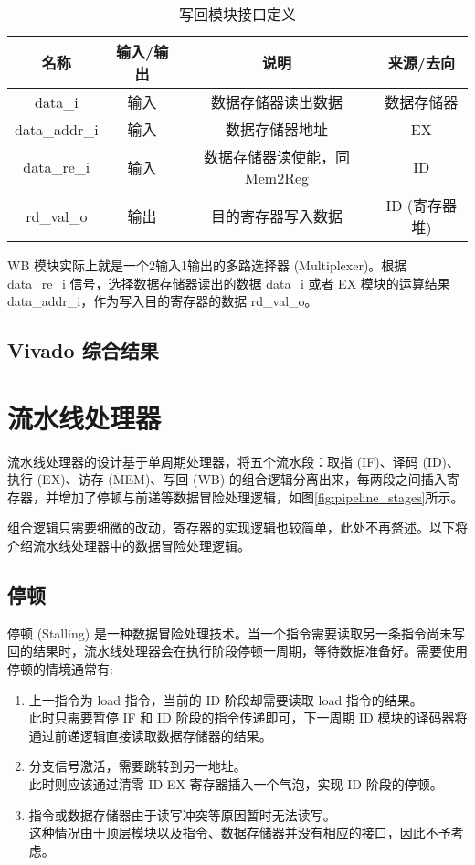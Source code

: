 \documentclass[lang=zh]{sjtureport}
\begin{document}
\begin{table}[!htp]
	\centering
	\caption{写回模块接口定义}
	\label{tab:single_wb_io}
	\begin{tabular}{|c|c|c|c|}
		\hline
		名称 & 输入/输出 & 说明 & 来源/去向 \\
		\hline
		data\_i & 输入 & 数据存储器读出数据 & 数据存储器 \\
		\hline
		data\_addr\_i & 输入 & 数据存储器地址 & EX \\
		\hline
		data\_re\_i & 输入 & 数据存储器读使能，同Mem2Reg\cite{COD} & ID \\
		\hline
		rd\_val\_o & 输出 & 目的寄存器写入数据 & ID (寄存器堆) \\
		\hline
	\end{tabular}
\end{table}

WB 模块实际上就是一个2输入1输出的多路选择器 (Multiplexer)。根据 data\_re\_i 信号，选择数据存储器读出的数据 data\_i 或者 EX 模块的运算结果 data\_addr\_i，作为写入目的寄存器的数据 rd\_val\_o。

\subsection{Vivado 综合结果}

\section{流水线处理器}

流水线处理器的设计基于单周期处理器，将五个流水段：取指 (IF)、译码 (ID)、执行 (EX)、访存 (MEM)、写回 (WB) 的组合逻辑分离出来，每两段之间插入寄存器，并增加了停顿与前递等数据冒险处理逻辑，如图\ref{fig:pipeline_stages}所示。

组合逻辑只需要细微的改动，寄存器的实现逻辑也较简单，此处不再赘述。以下将介绍流水线处理器中的数据冒险处理逻辑。

\subsection{停顿}

停顿 (Stalling) 是一种数据冒险处理技术。当一个指令需要读取另一条指令尚未写回的结果时，流水线处理器会在执行阶段停顿一周期，等待数据准备好。需要使用停顿的情境通常有:

\begin{enumerate}
	\item 上一指令为 load 指令，当前的 ID 阶段却需要读取 load 指令的结果。 \\
	此时只需要暂停 IF 和 ID 阶段的指令传递即可，下一周期 ID 模块的译码器将通过前递逻辑直接读取数据存储器的结果。
	\item 分支信号激活，需要跳转到另一地址。 \\
	此时则应该通过清零 ID-EX 寄存器插入一个气泡，实现 ID 阶段的停顿。
	\item 指令或数据存储器由于读写冲突等原因暂时无法读写。 \\
	这种情况由于顶层模块以及指令、数据存储器并没有相应的接口，因此不予考虑。
\end{enumerate}
\end{document}
